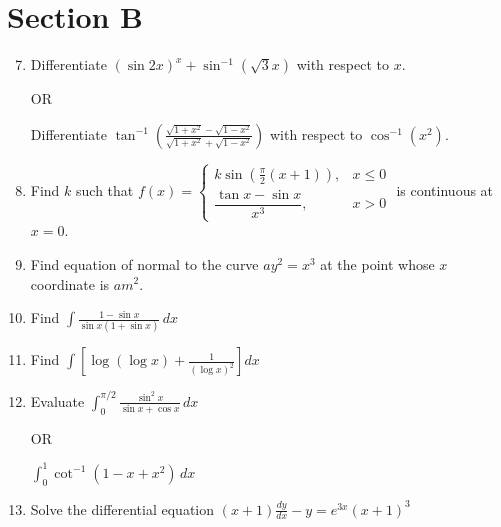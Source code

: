 \documentclass[12pt]{article}
\begin{document}
\section*{Section B}

\begin{enumerate}
    \setcounter{enumi}{6} %
    \item Differentiate $(\sin 2x)^x + \sin^{-1}(\sqrt{3}x)$ with respect to $x$.  

    OR  

    Differentiate $\tan^{-1}\left(\frac{\sqrt{1+x^2}-\sqrt{1-x^2}}{\sqrt{1+x^2}+\sqrt{1-x^2}}\right)$ with respect to $\cos^{-1}(x^2)$.

    \item Find $k$ such that $f(x)=\begin{cases}k\sin(\tfrac{\pi}{2}(x+1)),&x\leq 0\\ \dfrac{\tan x-\sin x}{x^3},&x>0\end{cases}$ is continuous at $x=0$.

    \item Find equation of normal to the curve $ay^2=x^3$ at the point whose $x$ coordinate is $am^2$.

    \item Find $\int \frac{1-\sin x}{\sin x(1+\sin x)} \, dx$

    \item Find $\int \left[\log(\log x)+\frac{1}{(\log x)^2}\right] dx$

    \item Evaluate $\int_{0}^{\pi/2} \frac{\sin^2 x}{\sin x + \cos x} \, dx$  

    OR  

    $\int_{0}^{1} \cot^{-1}(1-x+x^2) \, dx$

    \item Solve the differential equation $(x+1)\frac{dy}{dx} - y = e^{3x}(x+1)^3$
\end{enumerate}
\end{document}
